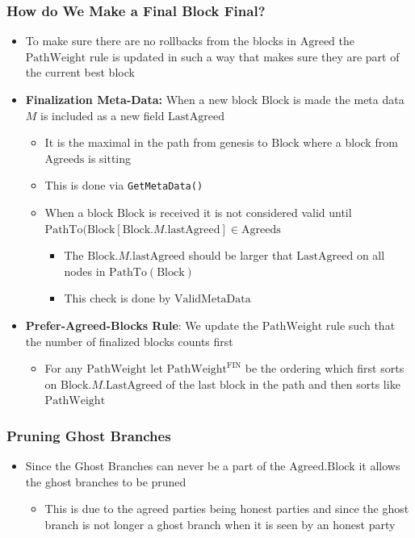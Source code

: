 \documentclass[11pt]{article}
\begin{document}
\subsubsection{How do We Make a Final Block Final?}
\label{sec:org9e1451a}
\begin{itemize}
\item To make sure there are no rollbacks from the blocks in \(\text{Agreed}\) the \(\text{PathWeight}\) rule is updated in such a way that makes sure they are part of the current best block

\item \textbf{Finalization Meta-Data:} When a new block \(\text{Block}\) is made the meta data \(M\) is included as a new field \(\text{LastAgreed}\)
\begin{itemize}
\item It is the maximal in the path from genesis to \(\text{Block}\) where a block from \(\text{Agreeds}\) is sitting
\item This is done via \texttt{GetMetaData()}
\item When a block \(\text{Block}\) is received it is not considered valid until \(\text{PathTo}(\text{Block}[\text{Block}.M.\text{lastAgreed}] \in \text{Agreeds}\)
\begin{itemize}
\item The  \(\text{Block}.M.\text{lastAgreed}\) should be larger that \(\text{LastAgreed}\) on all nodes in \(\text{PathTo}(\text{Block})\)

\item This check is done by \(\text{ValidMetaData}\)
\end{itemize}
\end{itemize}

\item \textbf{Prefer-Agreed-Blocks Rule}: We update the \(\text{PathWeight}\) rule such that the number of finalized blocks counts first
\begin{itemize}
\item For any \(\text{PathWeight}\) let \(\text{PathWeight}^\text{FIN}\) be the ordering which first sorts on \(\text{Block}.M.\text{LastAgreed}\) of the last block in the path and then sorts like \(\text{PathWeight}\)
\end{itemize}
\end{itemize}

\subsubsection{Pruning Ghost Branches}
\label{sec:org33267cd}
\begin{itemize}
\item Since the Ghost Branches can never be a part of the \(\text{Agreed.Block}\) it allows the ghost branches to be pruned
\begin{itemize}
\item This is due to the agreed parties being honest parties and since the ghost branch is not longer a ghost branch when it is seen by an honest party
\end{itemize}
\end{itemize}
\end{document}
